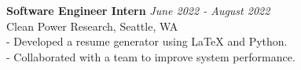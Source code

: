 \textbf{Software Engineer Intern} \hfill \textit{June 2022 - August 2022} \\
Clean Power Research, Seattle, WA \\
- Developed a resume generator using LaTeX and Python. \\
- Collaborated with a team to improve system performance. \\[0.5em]